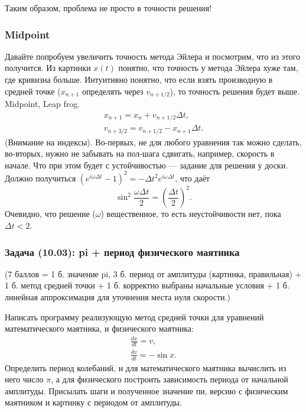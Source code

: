 \documentclass{book}
\begin{document}
Таким образом, проблема не просто в точности решения!

\subsubsection{Midpoint}

Давайте попробуем увеличить точность метода Эйлера и посмотрим, что из этого получится. Из картинки
$x(t)$ понятно, что точность у метода Эйлера хуже там, где кривизна больше. Интуитивно понятно, что
если взять производную в средней точке ($x_{n+1}$ определять через $v_{n + 1/2}$), то точность
решения будет выше. Midpoint, Leap frog.
\begin{eqnarray}
    x_{n + 1} = x_n + v_{n + 1/2} \Delta t, \\
    v_{n + 3/2} = v_{n + 1/2} - x_{n + 1} \Delta t.
\end{eqnarray}
(Внимание на индексы). Во-первых, не для любого уравнения так можно сделать, во-вторых, нужно не
забывать на пол-шага сдвигать, например, скорость в начале. Что при этом будет с устойчивостью ---
задание для решения у доски. Должно получиться $(e^{i \omega \Delta t} - 1)^2 = -\Delta t^2 e^{i
\omega \Delta t}$, что даёт
\begin{equation}
    \sin^2 \frac{\omega \Delta t}{2} = \left( \frac{\Delta t}{2} \right)^2.
\end{equation}
Очевидно, что решение ($\omega$) вещественное, то есть неустойчивости нет, пока $\Delta t < 2$.

\subsubsection{Задача (10.03): pi + период физического маятника}
(7 баллов = 1 б. значение pi, 3 б.
период от амплитуды (картинка, правильная) + 1 б. метод средней точки + 1 б. корректно выбраны начальные
условия + 1 б. линейная аппроксимация для уточнения места нуля скорости.)

Написать программу реализующую метод средней точки для уравнений математического маятника, и
физического маятника:
\begin{eqnarray}
    \frac{dx}{dt} = v, \\
    \frac{dv}{dt} = - \sin x.
\end{eqnarray}
Определить период колебаний, и для математического маятника вычислить из него число $\pi$, а для
физического построить зависимость периода от начальной амплитуды. Присылать шаги и полученное
значение пи, версию с физическим маятником и картинку с периодом от амплитуды.
\end{document}
